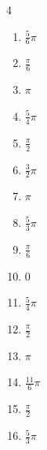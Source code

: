 \begin{multicols}{4}
\begin{enumerate}
  \item $\displaystyle \frac{5}{6}\pi$

  \item $\displaystyle \frac{\pi}{6}$

  \item $\displaystyle \pi$

  \item $\displaystyle \frac{5}{4}\pi$

  \item $\displaystyle \frac{\pi}{2}$

  \item $\displaystyle \frac{3}{2}\pi$

  \item $\displaystyle \pi$

  \item $\displaystyle \frac{5}{3}\pi$

  \item $\displaystyle \frac{\pi}{6}$

  \item $\displaystyle 0$

  \item $\displaystyle \frac{5}{4}\pi$

  \item $\displaystyle \frac{\pi}{2}$

\columnbreak %

\resetques

  \item $\displaystyle \pi$

  \item $\displaystyle \frac{11}{6}\pi$

  \item $\displaystyle \frac{\pi}{2}$

  \item $\displaystyle \frac{5}{3}\pi$


\end{enumerate}
\end{multicols}
